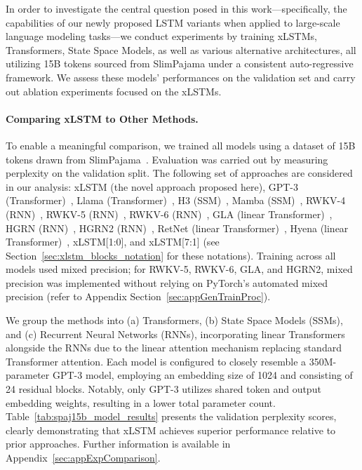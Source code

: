 In order to investigate the central question posed in this work—specifically, the capabilities of our newly proposed LSTM variants when applied to large-scale language modeling tasks—we conduct experiments by training xLSTMs, Transformers, State Space Models, as well as various alternative architectures, all utilizing 15B tokens sourced from SlimPajama under a consistent auto-regressive framework. We assess these models’ performances on the validation set and carry out ablation experiments focused on the xLSTMs.

\paragraph{Comparing xLSTM to Other Methods.} To enable a meaningful comparison, we trained all models using a dataset of 15B tokens drawn from SlimPajama~\citep{Soboleva:23}. Evaluation was carried out by measuring perplexity on the validation split. The following set of approaches are considered in our analysis: xLSTM (the novel approach proposed here), GPT-3 (Transformer)~\citep{Brown:20short}, Llama (Transformer)~\citep{Touvron:23arxiv}, H3 (SSM)~\citep{Fu:23}, Mamba (SSM)~\citep{Gu:24arxiv}, RWKV-4 (RNN)~\citep{Peng:23arxivshort}, RWKV-5 (RNN)~\citep{Peng:24arxivshort}, RWKV-6 (RNN)~\citep{Peng:24arxivshort}, GLA (linear Transformer)~\citep{Yang:23arxiv}, HGRN (RNN)~\citep{Qin:23}, HGRN2 (RNN)~\citep{Qin:24arxiv}, RetNet (linear Transformer)~\citep{Sun:23arxiv}, Hyena (linear Transformer)~\citep{Poli:23}, xLSTM[1:0], and xLSTM[7:1] (see Section~\ref{sec:xlstm_blocks_notation} for these notations). Training across all models used mixed precision; for RWKV-5, RWKV-6, GLA, and HGRN2, mixed precision was implemented without relying on PyTorch’s automated mixed precision (refer to Appendix Section~\ref{sec:appGenTrainProc}). 

We group the methods into (a) Transformers, (b) State Space Models (SSMs), and (c) Recurrent Neural Networks (RNNs), incorporating linear Transformers alongside the RNNs due to the linear attention mechanism replacing standard Transformer attention. Each model is configured to closely resemble a 350M-parameter GPT-3 model, employing an embedding size of 1024 and consisting of 24 residual blocks. Notably, only GPT-3 utilizes shared token and output embedding weights, resulting in a lower total parameter count. Table~\ref{tab:spaj15b_model_results} presents the validation perplexity scores, clearly demonstrating that xLSTM achieves superior performance relative to prior approaches. Further information is available in Appendix~\ref{sec:appExpComparison}. 

